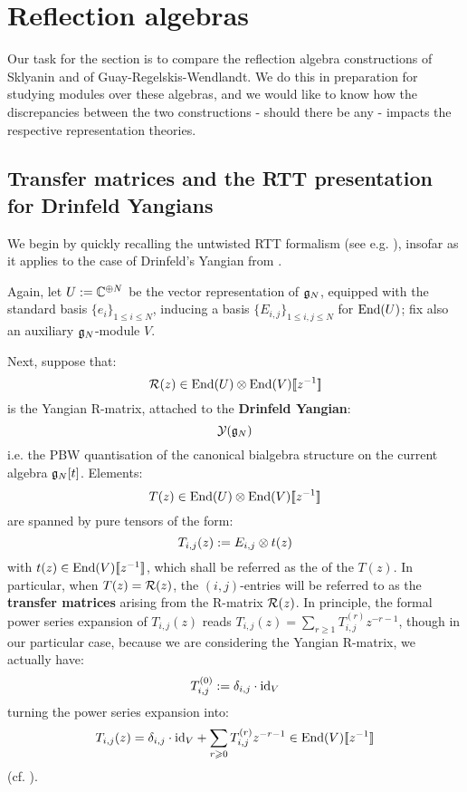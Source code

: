 \section{Reflection algebras}
    Our task for the section is to compare the reflection algebra constructions of Sklyanin and of Guay-Regelskis-Wendlandt. We do this in preparation for studying modules over these algebras, and we would like to know how the discrepancies between the two constructions - should there be any - impacts the respective representation theories.

    \subsection{Transfer matrices and the RTT presentation for Drinfeld Yangians}
        We begin by quickly recalling the untwisted RTT formalism (see e.g. \cite[Proposition 11.3]{etingof_schiffmann_lectures_on_quantum_groups}), insofar as it applies to the case of Drinfeld's Yangian from \cite{drinfeld_original_yangian_paper}.
        
        Again, let $U := \mathbb{C}^{\oplus N}$ be the vector representation of $\mathfrak{g}_N$, equipped with the standard basis $\{e_i\}_{1 \leq i \leq N}$, inducing a basis $\{E_{i, j}\}_{1 \leq i, j \leq N}$ for $\mathrm{End}(U)$; fix also an auxiliary $\mathfrak{g}_N$-module $V$.
        
        Next, suppose that:
            $$\calR(z) \in \End(U) \tensor \End(V)[\![z^{-1}]\!]$$
        is the Yangian R-matrix, attached to the \textbf{Drinfeld Yangian}:
            $$\mathcal{Y}(\mathfrak{g}_N)$$
        i.e. the PBW quantisation of the canonical bialgebra structure on the current algebra $\mathfrak{g}_N[t]$. Elements:
            $$T(z) \in \End(U) \tensor \End(V)[\![z^{-1}]\!]$$
        are spanned by pure tensors of the form:
            $$T_{i, j}(z) := E_{i, j} \tensor t(z)$$
        with $t(z) \in \mathrm{End}(V)[\![z^{-1}]\!]$, which shall be referred as the  of the  $T(z)$. In particular, when $T(z) = \mathcal{R}(z)$, the $(i, j)$-entries will be referred to as the \textbf{transfer matrices} arising from the R-matrix $\mathcal{R}(z)$. In principle, the formal power series expansion of $T_{i, j}(z)$ reads $T_{i, j}(z) = \sum_{r \geq 1} T_{i, j}^{(r)} z^{-r - 1}$, though in our particular case, because we are considering the Yangian R-matrix, we actually have:
            $$T_{i, j}^{(0)} := \delta_{i, j} \cdot \mathrm{id}_V$$
        turning the power series expansion into:
            \begin{equation} \label{equation: untwisted_yangian_transfer_matrices}
                T_{i, j}(z) = \delta_{i, j} \cdot \mathrm{id}_V + \sum_{r \geqslant 0} T_{i, j}^{(r)} z^{-r - 1} \in \mathrm{End}(V)[\![z^{-1}]\!]
            \end{equation}
        (cf. \cite[Subsection 11.3.1]{etingof_schiffmann_lectures_on_quantum_groups}).

